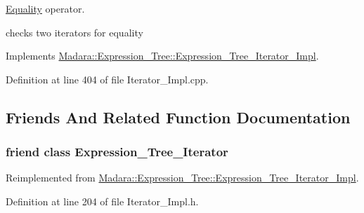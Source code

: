 \hyperlink{classMadara_1_1Expression__Tree_1_1Equality}{Equality} operator. 

checks two iterators for equality 

Implements \hyperlink{classMadara_1_1Expression__Tree_1_1Expression__Tree__Iterator__Impl_a05aaa44a9c047b7863789792d8d7830a}{Madara::Expression\_\-Tree::Expression\_\-Tree\_\-Iterator\_\-Impl}.



Definition at line 404 of file Iterator\_\-Impl.cpp.



\subsection{Friends And Related Function Documentation}
\hypertarget{classMadara_1_1Expression__Tree_1_1Post__Order__Iterator__Impl_adfe8d209b4dd64ac100d4c9c9adf08c1}{
\subsubsection[{Expression\_\-Tree\_\-Iterator}]{\setlength{\rightskip}{0pt plus 5cm}friend class {\bf Expression\_\-Tree\_\-Iterator}}}
\label{d4/d3e/classMadara_1_1Expression__Tree_1_1Post__Order__Iterator__Impl_adfe8d209b4dd64ac100d4c9c9adf08c1}


Reimplemented from \hyperlink{classMadara_1_1Expression__Tree_1_1Expression__Tree__Iterator__Impl_adfe8d209b4dd64ac100d4c9c9adf08c1}{Madara::Expression\_\-Tree::Expression\_\-Tree\_\-Iterator\_\-Impl}.



Definition at line 204 of file Iterator\_\-Impl.h.

